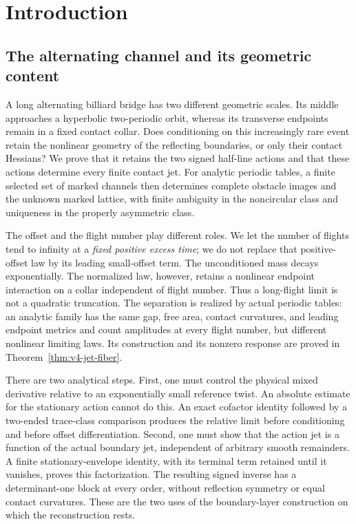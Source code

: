 \section{Introduction}
\label{sec:v56-introduction}






\subsection{The alternating channel and its geometric content}

A long alternating billiard bridge has two different geometric scales.
Its middle approaches a hyperbolic two-periodic orbit, whereas its
transverse endpoints remain in a fixed contact collar.  Does conditioning
on this increasingly rare event retain the nonlinear geometry of the
reflecting boundaries, or only their contact Hessians?  We prove that it
retains the two signed half-line actions and that these actions determine
every finite contact jet.  For analytic periodic tables, a finite selected
set of marked channels then determines complete obstacle images and the
unknown marked lattice, with finite ambiguity in the noncircular class
and uniqueness in the properly asymmetric class.

The offset and the flight number play different roles.  We let the number
of flights tend to infinity at a \emph{fixed positive excess time}; we do
not replace that positive-offset law by its leading small-offset term.
The unconditioned mass decays exponentially.  The normalized law,
however, retains a nonlinear endpoint interaction on a collar independent
of flight number.  Thus a long-flight limit is not a quadratic truncation.
The separation is realized by actual periodic tables: an analytic family
has the same gap, free area, contact curvatures, and leading endpoint
metrics and count amplitudes at every flight number, but different
nonlinear limiting laws.  Its construction and its nonzero response are
proved in Theorem~\ref{thm:v4-jet-fiber}.

There are two analytical steps.  First, one must control the physical
mixed derivative relative to an exponentially small reference twist.
An absolute estimate for the stationary action cannot do this.  An exact
cofactor identity followed by a two-ended trace-class comparison produces
the relative limit before conditioning and before offset differentiation.
Second, one must show that the action jet is a function of the actual
boundary jet, independent of arbitrary smooth remainders.  A finite
stationary-envelope identity, with its terminal term retained until it
vanishes, proves this factorization.  The resulting signed inverse has a
determinant-one block at every order, without reflection symmetry or
equal contact curvatures.  These are the two uses of the boundary-layer
construction on which the reconstruction rests.



